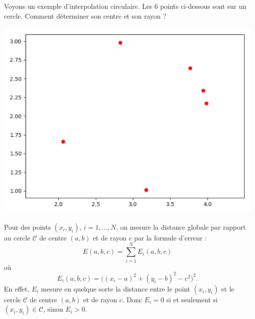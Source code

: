 \begin{exemple}{}{}
	Voyons un exemple d'interpolation circulaire.
	Les $6$ points ci-dessous sont sur un cercle. Comment déterminer son centre et son rayon ?
	\begin{center}
		\includegraphics[scale=\myscale,scale=0.5]{figures/circulaire-01}
	\end{center}
	
	Pour des points $(x_i,y_i)$, $i=1,\ldots, N$, on mesure la distance globale par rapport au cercle $\mathcal{C}$ de centre $(a,b)$ et de rayon $c$ par la formule d'erreur :
	$$E(a,b,c) = \sum_{i=1}^N E_i(a,b,c)$$
	où 
	$$E_i(a,b,c) = \big( (x_i-a)^2 + (y_i-b)^2 - c^2 \big)^2.$$
	En effet, $E_i$ mesure en quelque sorte la distance entre le point $(x_i,y_i)$ et le cercle $\mathcal{C}$ de centre $(a,b)$ et de rayon $c$. Donc $E_i=0$ si et seulement si $(x_i,y_i) \in \mathcal{C}$, sinon $E_i > 0$.
	
	

\end{exemple}
